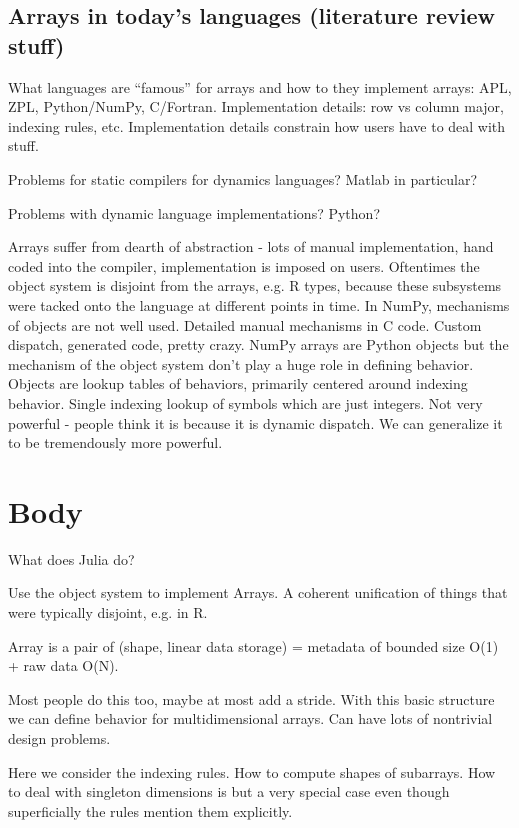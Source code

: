 \documentclass[preprint]{sigplanconf}
\begin{document}
\subsection{Arrays in today's languages (literature review stuff)}

What languages are ``famous'' for arrays and how to they implement
arrays: APL, ZPL, Python/NumPy, C/Fortran. Implementation details:
row vs column major, indexing rules, etc. Implementation details constrain
how users have to deal with stuff.

Problems for static compilers for dynamics languages? Matlab in particular?

Problems with dynamic language implementations? Python?

Arrays suffer from dearth of abstraction - lots of manual implementation,
hand coded into the compiler, implementation is imposed on users.
Oftentimes the object system is disjoint from the arrays, e.g. R types,
because these subsystems were tacked onto the language at different
points in time. In NumPy, mechanisms of objects are not well used.
Detailed manual mechanisms in C code. Custom dispatch, generated code,
pretty crazy. NumPy arrays are Python objects but the mechanism of
the object system don't play a huge role in defining behavior. Objects
are lookup tables of behaviors, primarily centered around indexing
behavior. Single indexing lookup of symbols which are just integers.
Not very powerful - people think it is because it is dynamic dispatch.
We can generalize it to be tremendously more powerful.


\section{Body}

What does Julia do?


Use the object system to implement Arrays. A coherent unification
of things that were typically disjoint, e.g. in R. 

Array is a pair of (shape, linear data storage) = metadata of bounded
size O(1) + raw data O(N).

Most people do this too, maybe at most add a stride. With this basic
structure we can define behavior for multidimensional arrays. Can have
lots of nontrivial design problems.

Here we consider the indexing rules. How to compute shapes of subarrays.
How to deal with singleton dimensions is but a very special case even
though superficially the rules mention them explicitly.
\end{document}

